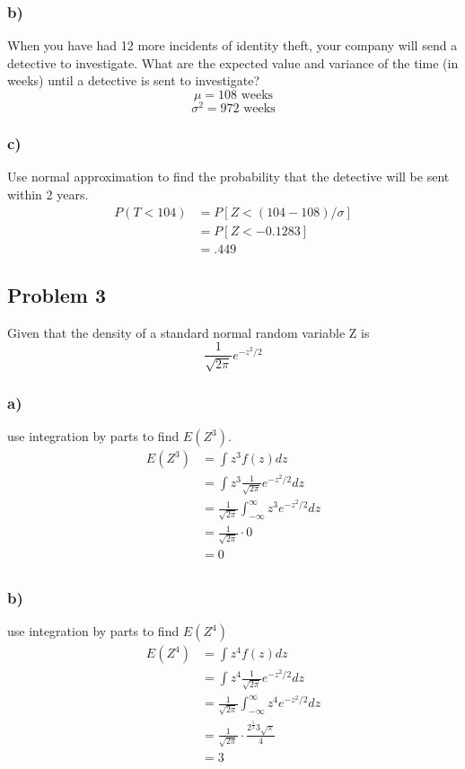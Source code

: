 \documentclass{article}
\begin{document}
\subsubsection*{b)}
When you have had 12 more incidents of identity theft, your company will send a detective to investigate. What are the expected value and variance of the time (in weeks) until a detective is sent to investigate?
\begin{equation}
    \mu = \boxed{108\text{ weeks}}
\end{equation}
\begin{equation}
    \sigma^2 = \boxed{972\text{ weeks}}
\end{equation}
\subsubsection*{c)}
Use  normal  approximation  to  find  the  probability  that  the  detective  will  be  sent  within  2 years. 
\begin{align}
    P( T < 104) &= P[Z <  (104-108) / \sigma ]\\
    &= P[Z <  -0.1283 ]\\
    &= \boxed{.449}
\end{align}
\subsection*{Problem 3}
Given that the density of a standard normal random variable Z is
\begin{equation} 
    \frac{1}{\sqrt{2\pi}}e^{-z^2/2}
\end{equation}
\subsubsection*{a)}
use integration by parts to find $E(Z^3)$. 
\begin{align}
    E(Z^3) &= \int z^3 f(z)dz\\
    &= \int z^3 \frac{1}{\sqrt{2\pi}}e^{-z^2/2}dz\\
    &= \frac{1}{\sqrt{2\pi}}\int_{-\infty}^\infty z^3e^{-z^2/2}dz\\
    &= \frac{1}{\sqrt{2\pi}}\cdot 0\\
    &= \boxed{0}\\
\end{align}
\subsubsection*{b)}
use integration by parts to find $E(Z^4)$
\begin{align}
    E(Z^4) &= \int z^4 f(z)dz\\
    &= \int z^4 \frac{1}{\sqrt{2\pi}}e^{-z^2/2}dz\\
    &= \frac{1}{\sqrt{2\pi}}\int_{-\infty}^\infty z^4e^{-z^2/2}dz\\
    &= \frac{1}{\sqrt{2\pi}}\cdot \frac{2^{\frac{5}{2}}3\sqrt{\pi}}{4}\\
    &= \boxed{3}\\
\end{align}
\end{document}

